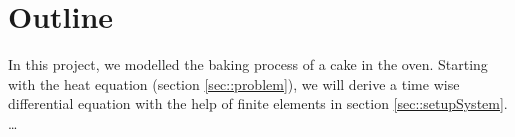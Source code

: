 
\section*{\label{sec::introduction}Outline}

In this project, we modelled the baking process of a cake in the oven. Starting with the heat equation (section \ref{sec::problem}), we will derive a time wise differential equation with the help of finite elements in section \ref{sec::setupSystem}. \dots